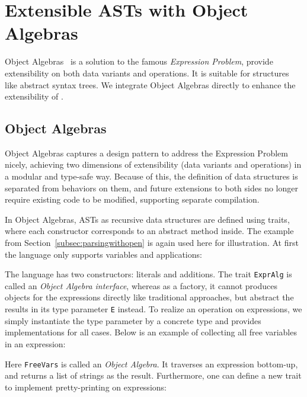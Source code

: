\section{Extensible ASTs with Object Algebras}\label{sec:algebrasandparsing}

Object Algebras~\cite{Oliveira2012} is a solution to the famous \textit{Expression Problem}, provide extensibility on
both data variants and operations. It is suitable for structures like abstract syntax trees. We integrate Object Algebras directly to enhance the extensibility of \name.

\subsection{Object Algebras}\label{subsec:objectalgebras}
Object Algebras captures a design pattern to address the Expression Problem nicely,
achieving two dimensions of extensibility (data variants and operations) in a modular and type-safe way.
Because of this, the definition of data structures is separated from behaviors on them, and future extensions
to both sides no longer require existing code to be modified, supporting separate compilation.

In Object Algebras, ASTs as recursive data structures are defined using traits, where each constructor corresponds
to an abstract method inside. The example from Section~\ref{subsec:parsingwithopen} is again used here for illustration.
At first the language only supports variables and applications:


The language has two constructors: literals and additions. The trait \lstinline{ExprAlg} is called an \textit{Object Algebra interface},
whereas as a factory, it cannot produces objects for the expressions directly like traditional approaches, but abstract the results in its
type parameter \lstinline{E} instead. To realize an operation on expressions, we simply instantiate the type parameter by a concrete type and
provides implementations for all cases. Below is an example of collecting all free variables in an expression:


Here \lstinline{FreeVars} is called an \textit{Object Algebra}. It traverses an expression bottom-up, and returns a list of strings as the result.
Furthermore, one can define a new trait to implement pretty-printing on expressions:

